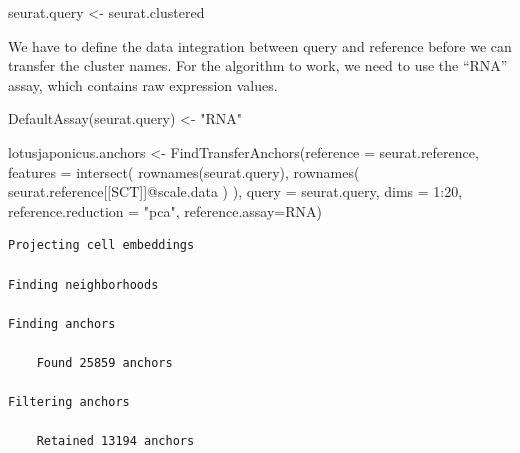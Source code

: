 \documentclass[
  letterpaper,
  DIV=11,
  numbers=noendperiod]{scrartcl}
\newenvironment{Shaded}{\begin{snugshade}}{\end{snugshade}}
\newcommand{\AttributeTok}[1]{\textcolor[rgb]{0.49,0.56,0.16}{#1}}
\newcommand{\DecValTok}[1]{\textcolor[rgb]{0.25,0.63,0.44}{#1}}
\newcommand{\FunctionTok}[1]{\textcolor[rgb]{0.02,0.16,0.49}{#1}}
\newcommand{\NormalTok}[1]{\textcolor[rgb]{0.00,0.44,0.13}{#1}}
\newcommand{\OtherTok}[1]{\textcolor[rgb]{0.00,0.44,0.13}{#1}}
\newcommand{\SpecialCharTok}[1]{\textcolor[rgb]{0.25,0.44,0.63}{#1}}
\newcommand{\StringTok}[1]{\textcolor[rgb]{0.25,0.44,0.63}{#1}}
\begin{document}
\begin{Shaded}
\begin{Highlighting}[]
\NormalTok{seurat.query }\OtherTok{\textless{}{-}}\NormalTok{ seurat.clustered}
\end{Highlighting}
\end{Shaded}

We have to define the data integration between query and reference
before we can transfer the cluster names. For the algorithm to work, we
need to use the ``RNA'' assay, which contains raw expression values.

\begin{Shaded}
\begin{Highlighting}[]
\FunctionTok{DefaultAssay}\NormalTok{(seurat.query) }\OtherTok{\textless{}{-}} \StringTok{"RNA"}
\end{Highlighting}
\end{Shaded}

\begin{Shaded}
\begin{Highlighting}[]
\NormalTok{lotusjaponicus.anchors }\OtherTok{\textless{}{-}} \FunctionTok{FindTransferAnchors}\NormalTok{(}\AttributeTok{reference =}\NormalTok{ seurat.reference, }
                                        \AttributeTok{features =} \FunctionTok{intersect}\NormalTok{( }\FunctionTok{rownames}\NormalTok{(seurat.query), }
                                                   \FunctionTok{rownames}\NormalTok{( seurat.reference[[}\StringTok{\textquotesingle{}SCT\textquotesingle{}}\NormalTok{]]}\SpecialCharTok{@}\NormalTok{scale.data ) ),}
                                        \AttributeTok{query =}\NormalTok{ seurat.query, }\AttributeTok{dims =} \DecValTok{1}\SpecialCharTok{:}\DecValTok{20}\NormalTok{, }
                                        \AttributeTok{reference.reduction =} \StringTok{"pca"}\NormalTok{,}
                                        \AttributeTok{reference.assay=}\StringTok{\textquotesingle{}RNA\textquotesingle{}}\NormalTok{)}
\end{Highlighting}
\end{Shaded}

\begin{verbatim}
Projecting cell embeddings

Finding neighborhoods

Finding anchors

    Found 25859 anchors

Filtering anchors

    Retained 13194 anchors
\end{verbatim}
\end{document}

